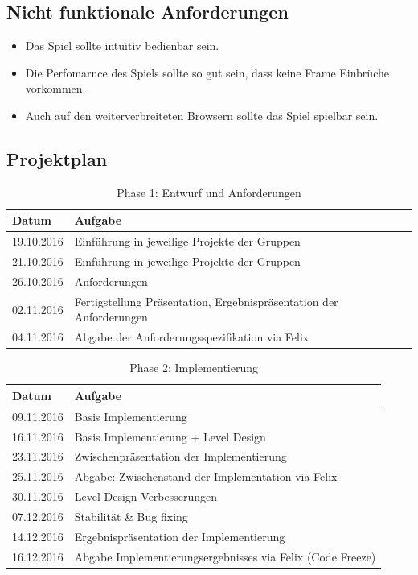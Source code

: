 \subsection{Nicht funktionale Anforderungen}
\begin{itemize}
	\item Das Spiel sollte intuitiv bedienbar sein.
	\item Die Perfomarnce des Spiels sollte so gut sein, dass keine Frame Einbrüche vorkommen.
	\item Auch auf den weiterverbreiteten Browsern sollte das Spiel spielbar sein.
\end{itemize}
\subsection{Projektplan}
\begin{table}[h]
	\begin{tabular}{l|l}
		\toprule
		\textbf{Datum}& \textbf{Aufgabe}\\
		\midrule
		19.10.2016 & Einführung in jeweilige Projekte der Gruppen 	\\ 
		21.10.2016 & Einführung in jeweilige Projekte der Gruppen	\\
		26.10.2016 & Anforderungen	\\ 
		02.11.2016 & Fertigstellung Präsentation, Ergebnispräsentation der Anforderungen \\
		04.11.2016 & Abgabe der Anforderungsspezifikation via Felix \\
		\bottomrule
	\end{tabular}
	\caption{Phase 1: Entwurf und Anforderungen}
\end{table}
\begin{table}[h]
	\begin{tabular}{l|l}
		\toprule
		\textbf{Datum}& \textbf{Aufgabe}\\
		\midrule
		09.11.2016 & Basis Implementierung 	\\ 
		16.11.2016 & Basis Implementierung + Level Design	\\
		23.11.2016 & Zwischenpräsentation der Implementierung	\\ 
		25.11.2016 & Abgabe: Zwischenstand der Implementation via Felix\\
		30.11.2016 & Level Design Verbesserungen \\
		07.12.2016 & Stabilität \& Bug fixing \\
		14.12.2016 & Ergebnispräsentation der Implementierung \\
		16.12.2016 & Abgabe Implementierungsergebnisses via Felix (Code Freeze) \\
		\bottomrule
	\end{tabular}
	\caption{Phase 2: Implementierung}
\end{table}
